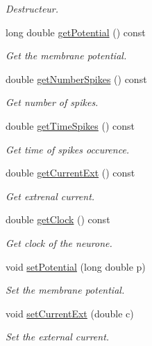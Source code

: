 \begin{DoxyCompactItemize}
\begin{DoxyCompactList}\small\item\em Destructeur. \end{DoxyCompactList}\item 
long double \hyperlink{classNeurone_a0786045c61c37a92f9c469e21c840749}{get\-Potential} () const 
\begin{DoxyCompactList}\small\item\em Get the membrane potential. \end{DoxyCompactList}\item 
double \hyperlink{classNeurone_ab9bc4b7e92b4f9b72204c3bee664fc0c}{get\-Number\-Spikes} () const 
\begin{DoxyCompactList}\small\item\em Get number of spikes. \end{DoxyCompactList}\item 
double \hyperlink{classNeurone_a0da764ac135dcd7ede665bf3c2cba140}{get\-Time\-Spikes} () const 
\begin{DoxyCompactList}\small\item\em Get time of spikes occurence. \end{DoxyCompactList}\item 
double \hyperlink{classNeurone_aa18f7bb1c2d33d5d953e8d9084947ffd}{get\-Current\-Ext} () const 
\begin{DoxyCompactList}\small\item\em Get extrenal current. \end{DoxyCompactList}\item 
double \hyperlink{classNeurone_a41ff0326ad0d84b00a8c968c7b7b9a42}{get\-Clock} () const 
\begin{DoxyCompactList}\small\item\em Get clock of the neurone. \end{DoxyCompactList}\item 
void \hyperlink{classNeurone_af3913a8bc53e5fbd5b8f29633a123b6b}{set\-Potential} (long double p)
\begin{DoxyCompactList}\small\item\em Set the membrane potential. \end{DoxyCompactList}\item 
void \hyperlink{classNeurone_a8c06c1d2ba2e7516e15df22e0f68a7d6}{set\-Current\-Ext} (double c)
\begin{DoxyCompactList}\small\item\em Set the external current. \end{DoxyCompactList}\item 

\end{DoxyCompactItemize}
